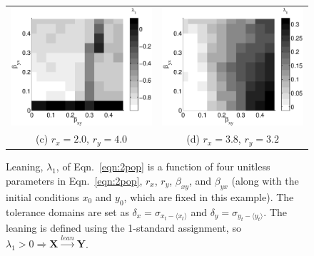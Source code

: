 \documentclass[twocolumn,aps,pre,groupedaddress]{revtex4-1}
\begin{document}
\begin{figure}[ht]
\begin{tabular}{cc}
\includegraphics[scale=0.30]{CoupLogexample_rx20ry40.eps} &
\includegraphics[scale=0.30]{CoupLogexample_rx38ry32.eps} \\
(c) $r_x = 2.0$, $r_y = 4.0$ & (d) $r_x = 3.8$, $r_y = 3.2$ \\
\end{tabular}
\caption{Leaning, $\lambda_1$, of Eqn.\ \ref{eqn:2pop} is a function of four unitless parameters in Eqn.\ \ref{eqn:2pop}, $r_x$, $r_y$, $\beta_{xy}$, and $\beta_{yx}$ (along with the initial conditions $x_0$ and $y_0$, which are fixed in this example).  The tolerance domains are set as $\delta_x = \sigma_{x_t-\langle x_t \rangle}$ and $\delta_y = \sigma_{y_t-\langle y_t \rangle}$.  The leaning is defined using the 1-standard assignment, so $\lambda_1>0\Rightarrow\mathbf{X}\xrightarrow{lean}\mathbf{Y}$.}
\label{fig:2pop}
\end{figure}
\end{document}
